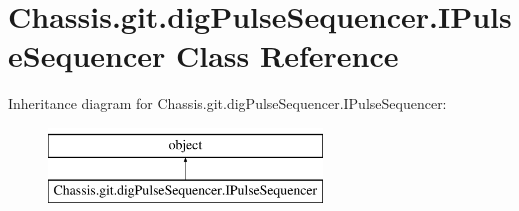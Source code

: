 \hypertarget{class_chassis_8git_1_1dig_pulse_sequencer_1_1_i_pulse_sequencer}{\section{Chassis.\-git.\-dig\-Pulse\-Sequencer.\-I\-Pulse\-Sequencer Class Reference}
\label{class_chassis_8git_1_1dig_pulse_sequencer_1_1_i_pulse_sequencer}
}
Inheritance diagram for Chassis.\-git.\-dig\-Pulse\-Sequencer.\-I\-Pulse\-Sequencer\-:\begin{figure}[H]
\begin{center}
\leavevmode
\includegraphics[height=2.000000cm]{class_chassis_8git_1_1dig_pulse_sequencer_1_1_i_pulse_sequencer}
\end{center}
\end{figure}
